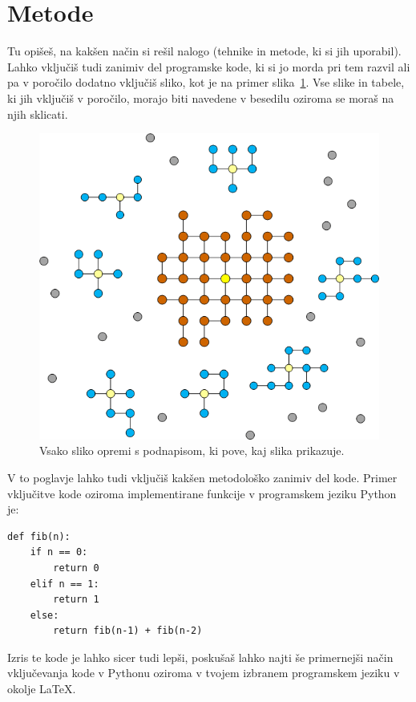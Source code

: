 \documentclass[a4paper,11pt]{article}
\begin{document}
\section{Metode}

Tu opišeš, na kakšen način si rešil nalogo (tehnike in metode, ki si
jih uporabil). Lahko vključiš tudi zanimiv del programske kode, ki
si jo morda pri tem razvil ali pa v poročilo dodatno vključiš sliko,
kot je na primer slika~\ref{slika1}. Vse slike in tabele, ki jih
vključiš v poročilo, morajo biti navedene v besedilu oziroma se moraš
na njih sklicati.

\begin{figure}[htbp]
\begin{center}
\includegraphics[scale=0.3]{slika-primer.png}
\caption{Vsako sliko opremi s podnapisom, ki pove, kaj slika prikazuje.}
\label{slika1}
\end{center}
\end{figure}

V to poglavje lahko tudi vključiš kakšen metodološko zanimiv del
kode. Primer vključitve kode oziroma implementirane funkcije v
programskem jeziku Python je:

\begin{lstlisting}
def fib(n):
    if n == 0:
        return 0
    elif n == 1:
        return 1
    else:
        return fib(n-1) + fib(n-2)
\end{lstlisting}

Izris te kode je lahko sicer tudi lepši, poskušaš lahko najti še
primernejši način vključevanja kode v Pythonu oziroma v tvojem izbranem
programskem jeziku v okolje \LaTeX{}.
\end{document}
